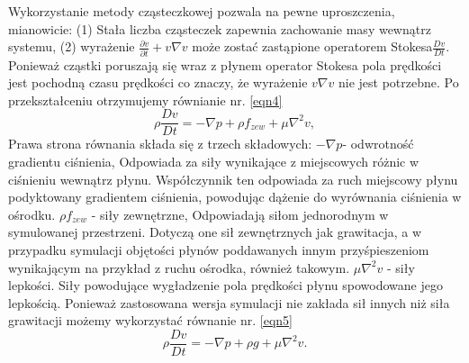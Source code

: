 \documentclass{article}
\begin{document}
Wykorzystanie metody cząsteczkowej pozwala na pewne uproszczenia, mianowicie:\newline
(1) Stała liczba cząsteczek zapewnia zachowanie masy wewnątrz systemu,\newline
(2) wyrażenie $\frac{\partial v}{\partial t} + v \nabla v$ może zostać zastąpione operatorem Stokesa$\frac{D v}{D t}$. 
Ponieważ cząstki poruszają się wraz z płynem operator Stokesa pola prędkości jest pochodną czasu prędkości co znaczy, że wyrażenie $v \nabla v$ nie jest potrzebne.\newline\newline
Po przekształceniu otrzymujemy równianie nr. \ref{eqn4}\newline
\begin{equation}\label{eqn4}
\rho \frac{D v}{D t}
= - \nabla p + \rho f_{zew} + \mu \nabla^2v,
\end{equation}
\newline
\indent
Prawa strona równania składa się z trzech składowych:\newline
$- \nabla p$- odwrotność gradientu ciśnienia,\newline
Odpowiada za siły wynikające z miejscowych różnic w ciśnieniu wewnątrz płynu.\newline
Współczynnik ten odpowiada za ruch miejscowy płynu podyktowany gradientem ciśnienia, powodując dążenie do wyrównania ciśnienia w ośrodku.\newline\newline
$\rho f_{zew}$ - siły zewnętrzne,\newline
Odpowiadają siłom jednorodnym w symulowanej przestrzeni. Dotyczą one sił zewnętrznych jak grawitacja, a w przypadku symulacji objętości płynów poddawanych innym przyśpieszeniom wynikającym na przykład z ruchu ośrodka, również takowym.\newline\newline
$\mu \nabla^2v$ - siły lepkości.\newline
Siły powodujące wygładzenie pola prędkości płynu spowodowane jego lepkością.\newline\newline
Ponieważ zastosowana wersja symulacji nie zakłada sił innych niż siła grawitacji możemy wykorzystać równanie nr. \ref{eqn5}\newline
\begin{equation}\label{eqn5}
\rho \frac{D v}{D t}
= - \nabla p + \rho g + \mu \nabla^2v.
\end{equation}
\end{document}
